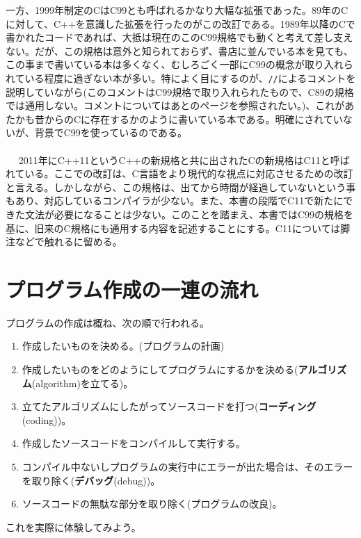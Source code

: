 一方、1999年制定のCはC99とも呼ばれるかなり大幅な拡張であった。89年のCに対して、C++を意識した拡張を行ったのがこの改訂である。1989年以降のCで書かれたコードであれば、大抵は現在のこのC99規格でも動くと考えて差し支えない。だが、この規格は意外と知られておらず、書店に並んでいる本を見ても、この事まで書いている本は多くなく、むしろごく一部にC99の概念が取り入れられている程度に過ぎない本が多い。特によく目にするのが、\verb|//|によるコメントを説明していながら(このコメントはC99規格で取り入れられたもので、C89の規格では通用しない。コメントについてはあとのページを参照されたい。)、これがあたかも昔からのCに存在するかのように書いている本である。明確にされていないが、背景でC99を使っているのである。
\\ \\　
2011年にC++11というC++の新規格と共に出されたCの新規格はC11と呼ばれている。ここでの改訂は、C言語をより現代的な視点に対応させるための改訂と言える。しかしながら、この規格は、出てから時間が経過していないという事もあり、対応しているコンパイラが少ない。また、本書の段階でC11で新たにできた文法が必要になることは少ない。このことを踏まえ、本書ではC99の規格を基に、旧来のC規格にも通用する内容を記述することにする。C11については脚注などで触れるに留める。

\section{プログラム作成の一連の流れ}
プログラムの作成は概ね、次の順で行われる。
\begin{enumerate}
\item 作成したいものを決める。(プログラムの計画)
\item 作成したいものをどのようにしてプログラムにするかを決める(\textbf{アルゴリズム}(algorithm)を立てる)。
\item 立てたアルゴリズムにしたがってソースコードを打つ(\textbf{コーディング}(coding))。
\item 作成したソースコードをコンパイルして実行する。
\item コンパイル中ないしプログラムの実行中にエラーが出た場合は、そのエラーを取り除く(\textbf{デバッグ}(debug))。
\item ソースコードの無駄な部分を取り除く(プログラムの改良)。
\end{enumerate}
これを実際に体験してみよう。

